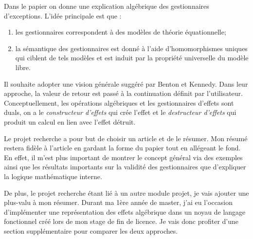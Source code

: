 	Dans le papier on donne une explication algébrique des gestionnaires d'exceptions. L'idée principale est que :
	\begin{enumerate}
		\item les gestionnaires correspondent à des modèles de théorie équationnelle;
		\item la sémantique des gestionnaires est donné à l'aide d'homomorphismes uniques qui ciblent de tels modèles et est induit par la propriété universelle du modèle libre. 
	\end{enumerate}

	Il souhaite adopter une vision générale suggéré par Benton et Kennedy. Dans leur approche, la valeur de retour est passé à la continuation définit par l'utilisateur.
	Conceptuellement, les opérations algébriques et les gestionnaires d'effets sont duals, on a le \textit{constructeur d'effets} qui crée l'effet et le \textit{destructeur d'effets} qui produit un calcul en lien avec l'effet détruit.
	\smallbreak
	
	Le projet recherche a pour but de choisir un article et de le résumer. Mon résumé restera fidèle à l'article en gardant
	la forme du papier tout en allégeant le fond. En effet, il m'est plus important de montrer le concept général via des exemples ainsi
	que les résultats importants sur la validité des gestionnaires que d'expliquer la logique mathématique interne.

	De plus, le projet recherche étant lié à un autre module projet, je vais ajouter une plus-valu à mon résumer. Durant ma 
	1ère année de master, j'ai eu l'occasion d'implémenter une représentation des effets algébrique dans un noyau de langage fonctionnel créé lors de mon stage de fin de licence. Je vais donc profiter d'une section supplémentaire pour comparer les deux approches.
	
	